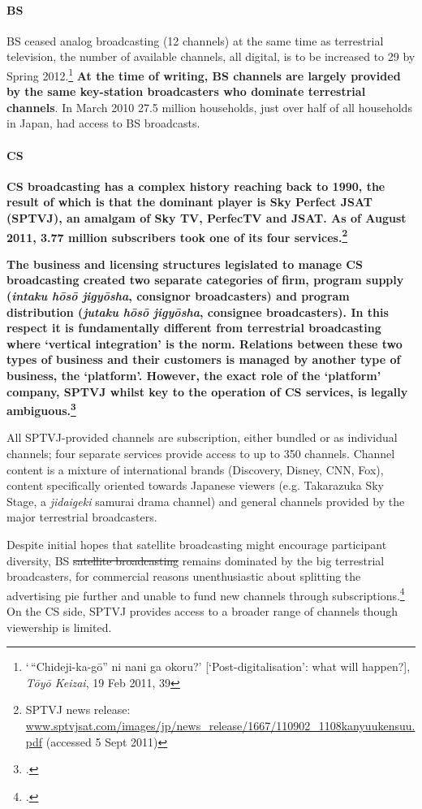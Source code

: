\documentclass[11pt, oneside, a4paper, headsepline]{scrartcl}
\newcommand{\citej}[2] {\footcite[\nopp #1]{#2} }
\newcommand{\TYKZ}{\emph{T\={o}y\={o} Keizai}}
\begin{document}
\paragraph{BS} BS ceased analog broadcasting (12 channels) at the same time as terrestrial television, the number of available channels, all digital, is to be increased to 29 by Spring 2012.\footnote{`\,``Chideji-ka-g\={o}'' ni nani ga okoru?' [`Post-digitalisation': what will happen?], \TYKZ, 19 Feb 2011, 39} \textbf{At the time of writing, BS channels are largely provided by the same key-station broadcasters who dominate terrestrial channels}. In March 2010 27.5 million households, just over half of all households in Japan, had access to BS broadcasts.

\paragraph{CS}{\bf CS broadcasting has a complex history reaching back to 1990, the result of which is that the dominant player is Sky Perfect JSAT (SPTVJ), an amalgam of Sky TV, PerfecTV and JSAT. As of August 2011, 3.77 million subscribers took one of its four services.\footnote{SPTVJ news release: \url{www.sptvjsat.com/images/jp/news_release/1667/110902_1108kanyuukensuu.pdf} (accessed 5 Sept 2011)}
}

{\bf The business and licensing structures legislated to manage CS broadcasting created two separate categories of firm, program supply (\emph{intaku hōsō jigyōsha}, consignor broadcasters) and program distribution (\emph{jutaku hōsō jigyōsha}, consignee broadcasters). In this respect it is fundamentally different from terrestrial broadcasting where `vertical integration' is the norm. Relations between these two types of business and their customers is managed by another type of business, the `platform'. However, the exact role of the `platform' company, SPTVJ whilst key to the operation of CS services, is legally ambiguous.\citej{73}{Kwak:2008}

All SPTVJ-provided channels are subscription, either bundled or as individual channels; four separate services provide access to up to 350 channels. Channel content is a mixture of international brands (Discovery, Disney, CNN, Fox), content specifically oriented towards Japanese viewers (e.g. Takarazuka Sky Stage, a \emph{jidaigeki} samurai drama channel) and general channels provided by the major terrestrial broadcasters.


\bigskip

Despite initial hopes that satellite broadcasting might encourage participant diversity, BS \st{satellite broadcasting} remains dominated by the big terrestrial broadcasters, for commercial reasons unenthusiastic about splitting the advertising pie further and unable to fund new channels through subscriptions.\citej{82--3}{Kwak:2008} On the CS side, SPTVJ provides access to a broader range of channels though viewership is limited.}
\end{document}
